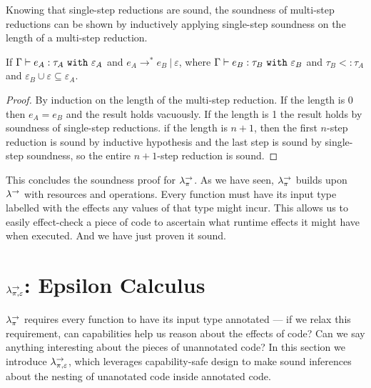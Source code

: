 Knowing that single-step reductions are sound, the soundness of multi-step reductions can be shown by inductively applying single-step soundness on the length of a multi-step reduction.

\begin{theorem}
If $ \Gamma \vdash  e_A:  \tau_A~\mathtt{with}~ \varepsilon_A$ and $e_A \longrightarrow^{*} e_B~|~\varepsilon$, where $\Gamma \vdash e_B: \tau_B~\mathtt{with}~ \varepsilon_B$ and $ \tau_B <: \tau_A$ and $\varepsilon_B \cup \varepsilon \subseteq \varepsilon_A$.
\end{theorem}

\begin{proof} By induction on the length of the multi-step reduction. If the length is 0 then $e_A = e_B$ and the result holds vacuously. If the length is 1 the result holds by soundness of single-step reductions. if the length is $n+1$, then the first $n$-step reduction is sound by inductive hypothesis and the last step is sound by single-step soundness, so the entire $n+1$-step reduction is sound.
\end{proof}

This concludes the soundness proof for $\lambda^{\rightarrow}_{\pi}$. As we have seen, $\lambda^{\rightarrow}_{\pi}$ builds upon $\lambda^{\rightarrow}$ with resources and operations. Every function must have its input type labelled with the effects any values of that type might incur. This allows us to easily effect-check a piece of code to ascertain what runtime effects it might have when executed. And we have just proven it sound.
























\section{$\lambda^{\rightarrow}_{\pi, \varepsilon}$: Epsilon Calculus}

$\lambda^{\rightarrow}_{\pi}$ requires every function to have its input type annotated --- if we relax this requirement, can capabilities help us reason about the effects of code? Can we say anything interesting about the pieces of unannotated code? In this section we introduce $\lambda^{\rightarrow}_{\pi, \varepsilon}$, which leverages capability-safe design to make sound inferences about the nesting of unanotated code inside annotated code.

